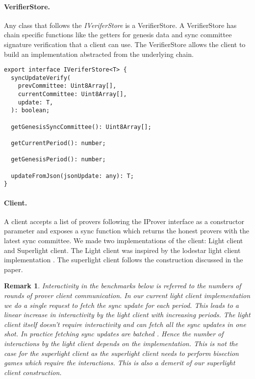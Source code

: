 \documentclass[a4paper,11pt,oneside]{article}
\newtheorem*{remark}{Remark}
\theoremstyle{definition}
\begin{document}
  \paragraph{VerifierStore.} Any class that follows the \textit{IVeriferStore} is a VerifierStore. A VerifierStore has chain specific functions like the getters for genesis data and sync committee signature verification that a client can use. The VerifierStore allows the client to build an implementation abstracted from the underlying chain.
  
  \begin{lstlisting}
export interface IVeriferStore<T> {
  syncUpdateVerify(
    prevCommittee: Uint8Array[],
    currentCommittee: Uint8Array[],
    update: T,
  ): boolean;

  getGenesisSyncCommittee(): Uint8Array[];

  getCurrentPeriod(): number;

  getGenesisPeriod(): number;

  updateFromJson(jsonUpdate: any): T;
}
  \end{lstlisting}
  
  \paragraph{Client.} A client accepts a list of provers following the IProver interface as a constructor parameter and exposes a sync function which returns the honest provers with the latest sync committee. We made two implementations of the client: Light client and Superlight client. The Light client was inspired by the lodestar light client implementation \cite{LodestarLightClient}. The superlight client follows the construction discussed in the paper.
  
  \begin{remark}
  Interactivity in the benchmarks below is referred to the numbers of rounds of prover client communication. In our current light client implementation we do a single request to fetch the sync update for each period. This leads to a linear increase in interactivity by the light client with increasing periods. The light client itself doesn't require interactivity and can fetch all the sync updates in one shot. In practice fetching sync updates are batched \cite{LodestarLightClient}. Hence the number of interactions by the light client depends on the implementation. This is not the case for the superlight client as the superlight client needs to perform bisection games which require the interactions. This is also a demerit of our superlight client construction. 
  \end{remark}
\end{document}
